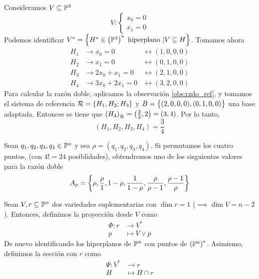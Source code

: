 \begin{example}
 Consideramos $V \subseteq \mathbb{P}^4$
 \[
  V : \begin{cases}
       x_0 = 0 \\ x_1 = 0
      \end{cases}
 \]
 Podemos identificar $V^* = \left\{H^* \in \left( \mathbb{P}^4 \right)^* \text{ hiperplano } \vert V \subseteq H\right\}$.
 Tomamos ahora
 \[
  \begin{aligned}
   H_1 &\rightarrow x_0 = 0 &\leftrightarrow (1,0,0,0) \\
   H_2 &\rightarrow x_1 = 0 &\leftrightarrow (0,1,0,0) \\
   H_3 &\rightarrow 2x_0+x_1 = 0 &\leftrightarrow (2,1,0,0) \\
   H_4 &\rightarrow 3x_0+2x_1 = 0 &\leftrightarrow (3,2,0,0)
  \end{aligned}
 \]
 Para calcular la razón doble, aplicamos la observación \ref{obs:rzdo_ref}, y tomamos el sistema
 de referencia $\mathcal{R} = \left\{H_1,H_2;H_3\right\}$ y $B = \left\{(2,0,0,0),(0,1,0,0)\right\}$ una base adaptada.
 Entonces se tiene que $\left( H_4 \right)_{\mathcal{R}} = \left( \frac{3}{2}, 2 \right) = (3,4)$. Por lo
 tanto,
 \[
  (H_1,H_2,H_3,H_4) = \frac{3}{4}
 \]
\end{example}

\begin{prop}
 Sean $q_1,q_2,q_3,q_4 \in \mathbb{P}^n$ y sea $\rho = (q_1,q_2,q_3,q_4)$. Si permutamos los cuatro
 puntos, (con $4! = 24$ posiblidades), obtendremos uno de los sisguientes valores para la
 razón doble
 \[
   A_p = \left\{\rho, \frac{\rho}{1}, 1-\rho, \frac{1}{1-\rho}, \frac{\rho}{\rho-1}, \frac{\rho-1}{\rho}\right\}
 \]

\end{prop}


\begin{defi}
 Sean $V,r \subseteq \mathbb{P}^n$ dos variedades suplementarias con $\dim r = 1$ ($\implies \dim V = n-2$).
 Entonces, definimos la proyección desde $V$ como
 \[
  \begin{aligned}
   \Phi \colon r &\to V^* \\ p &\mapsto V \vee p
  \end{aligned}
 \]
 De nuevo identificando los hiperplanos de $\mathbb{P}^n$ con puntos de $\left( \mathbb{P}^n \right)^*$. Asimismo,
 definimos la sección con $r$ como
 \[
  \begin{aligned}
   \Psi \colon V^* &\to r \\ H &\mapsto H \cap r
  \end{aligned}
 \]
\end{defi}

